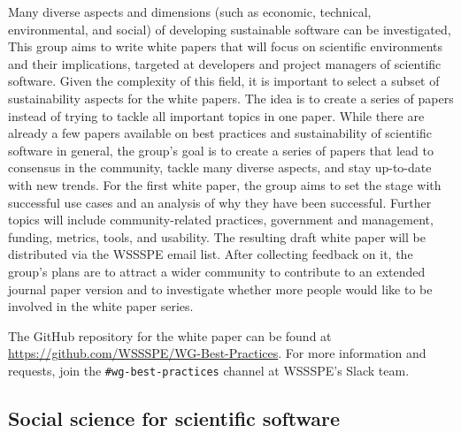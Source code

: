 \documentclass[11pt, oneside]{amsart}
\newcommand{\note}[1]{ {\textcolor{blueish}    { ***Note:      #1 }}}
\begin{document}
Many diverse aspects and dimensions (such as economic, technical, environmental, and social) of developing sustainable software can be investigated,
This group aims to write white papers
that will focus on scientific environments and their implications, targeted at developers
and project managers of scientific software. Given the complexity of this field, it is important to select
a subset of sustainability aspects for the white papers. The idea is to create a series of papers instead of trying
to tackle all important topics in one paper. 
%
While there are already a few papers available on best practices and sustainability of scientific software in general, the group's goal is to create a series of papers that lead to consensus in the community, tackle many diverse aspects, and stay up-to-date with new trends. 
%
For the first white paper, the group aims to set the
stage with successful use cases and an analysis of why they have been successful.
Further topics will include community-related practices, government and management, funding,
metrics, tools, and usability. 
The resulting draft white paper will be distributed via the WSSSPE email list. After collecting feedback on it, the group's plans are to attract a wider community to contribute to an extended journal paper version and to investigate whether more people would like to be involved in the white paper series.

The GitHub repository for the white paper can be found at \url{https://github.com/WSSSPE/WG-Best-Practices}. For more information and requests, join the \texttt{\#wg-best-practices} channel at WSSSPE's Slack team.



\subsection{Social science for scientific software}
\label{sec:social}


\end{document}
